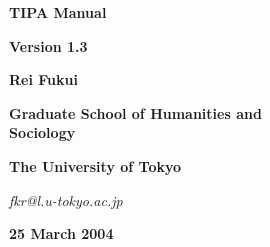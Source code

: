 %
%
%

\thispagestyle{empty}


\begin{center}
\renewcommand\sfdefault{cmss}
{\Huge \textsf{\textbf{TIPA Manual}}}
\par\vspace{1cm}
{\huge \textsf{\textbf{Version 1.3}}}
\par\vspace{5cm}
{\huge \textsf{\textbf{Rei Fukui}}}
\par\vspace{1cm}
{\LARGE \textsf{\textbf{Graduate School of Humanities and\\[4mm] Sociology}}}
\par\vspace{.5cm}
{\LARGE \textsf{\textbf{The University of Tokyo}}}
\par\vspace{1cm}
{\Large \textit{fkr@l.u-tokyo.ac.jp}}
\par\vspace{1cm}
{\LARGE \textsf{\textbf{25 March 2004}}}
\end{center}


\newpage
\thispagestyle{empty}


\Sweet
\IPAshape


